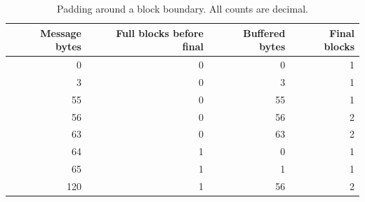 \begin{table}[htbp]
  \centering\caption{Padding around a block boundary. All counts are decimal.}
  \begin{tabular}{rrrr}
    \toprule
    Message bytes & Full blocks before final & Buffered bytes & Final blocks \\
    \midrule
    0             & 0                        & 0              & 1            \\
    3             & 0                        & 3              & 1            \\
    55            & 0                        & 55             & 1            \\
    56            & 0                        & 56             & 2            \\
    63            & 0                        & 63             & 2            \\
    64            & 1                        & 0              & 1            \\
    65            & 1                        & 1              & 1            \\
    120           & 1                        & 56             & 2            \\
    \bottomrule
  \end{tabular}
\end{table}
